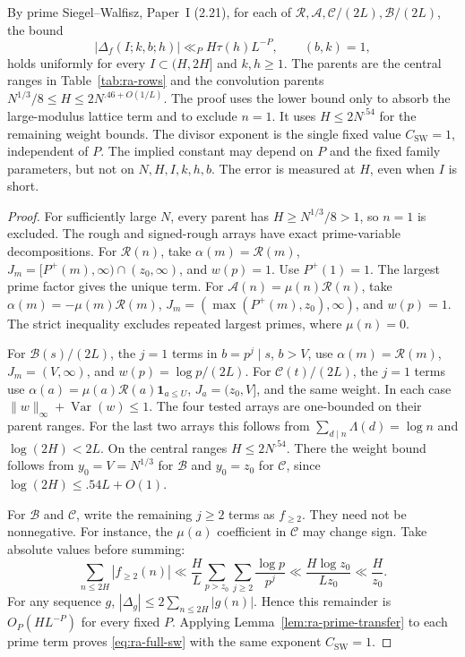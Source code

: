 \begin{lemma}
\label{lem:ra-sw}
By prime Siegel--Walfisz, Paper~I (2.21), for each of
\(\mathcal R,\mathcal A,\mathcal C/(2L),\mathcal B/(2L)\), the bound
\begin{equation}\label{eq:ra-full-sw}
 |\Delta_f(I;k,b;h)|\ll_P H\tau(h)L^{-P},
 \qquad (b,k)=1,
\end{equation}
holds uniformly for every \(I\subset(H,2H]\) and \(k,h\ge1\).
The parents are the
central ranges in Table~\ref{tab:ra-rows} and the convolution parents
\(N^{1/3}/8\le H\le2N^{.46+O(1/L)}\).
The proof uses the lower
bound only to absorb the large-modulus lattice term and to exclude \(n=1\).
It uses \(H\le2N^{.54}\) for the remaining weight bounds. The divisor
exponent is the single fixed value \(C_{\mathrm{SW}}=1\), independent of
\(P\). The implied constant may depend on \(P\) and the fixed family
parameters, but not on \(N,H,I,k,h,b\). The error is measured at \(H\),
even when \(I\) is short.
\end{lemma}
\begin{proof}
For sufficiently large \(N\), every parent has
\(H\ge N^{1/3}/8>1\), so \(n=1\) is excluded. The rough and signed-rough
arrays have exact prime-variable decompositions.
For \(\mathcal R(n)\), take \(\alpha(m)=\mathcal R(m)\),
\(J_m=[P^+(m),\infty)\cap(z_0,\infty)\), and \(w(p)=1\).
Use \(P^+(1)=1\). The largest prime factor gives the unique term. For
\(\mathcal A(n)=\mu(n)\mathcal R(n)\),
take \(\alpha(m)=-\mu(m)\mathcal R(m)\),
\(J_m=(\max(P^+(m),z_0),\infty)\), and \(w(p)=1\). The strict
inequality excludes repeated largest primes, where \(\mu(n)=0\).

For \(\mathcal B(s)/(2L)\), the \(j=1\) terms in
\(b=p^j\mid s\), \(b>V\), use \(\alpha(m)=\mathcal R(m)\),
\(J_m=(V,\infty)\), and \(w(p)=\log p/(2L)\). For
\(\mathcal C(t)/(2L)\), the \(j=1\) terms use
\(\alpha(a)=\mu(a)\mathcal R(a)\mathbf1_{a\le U}\),
\(J_a=(z_0,V]\), and the same weight. In each case
\(\|w\|_\infty+\operatorname{Var}(w)\le1\).
The four tested arrays
are one-bounded on their parent ranges. For the last two arrays this follows
from \(\sum_{d\mid n}\Lambda(d)=\log n\) and
\(\log(2H)<2L\). On the central ranges \(H\le2N^{.54}\).
There the weight bound follows from \(y_0=V=N^{1/3}\) for \(\mathcal B\) and \(y_0=z_0\)
for \(\mathcal C\), since \(\log(2H)\le .54L+O(1)\).

For \(\mathcal B\) and \(\mathcal C\), write the remaining \(j\ge2\)
terms as \(f_{\ge2}\). They need not be nonnegative.
For instance, the
\(\mu(a)\) coefficient in \(\mathcal C\) may change sign.
Take absolute values before summing:
\[
 \sum_{n\le2H}|f_{\ge2}(n)|
 \ll \frac{H}{L}\sum_{p>z_0}\sum_{j\ge2}\frac{\log p}{p^j}
 \ll \frac{H\log z_0}{Lz_0}
 \ll \frac{H}{z_0}.
\]
For any sequence \(g\),
\(|\Delta_g|\le2\sum_{n\le2H}|g(n)|\).
Hence this remainder is
\(O_P(HL^{-P})\) for every fixed \(P\). Applying
Lemma~\ref{lem:ra-prime-transfer} to each prime term proves
\eqref{eq:ra-full-sw} with the same exponent \(C_{\mathrm{SW}}=1\).
\end{proof}
